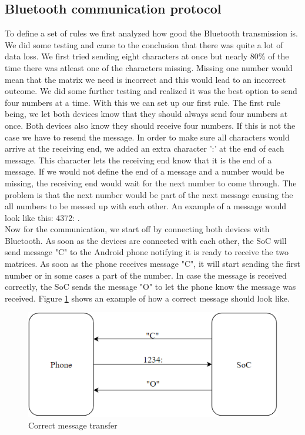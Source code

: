 \documentclass[a4paper, 11pt]{report}
\begin{document}
	\subsection{Bluetooth communication protocol}\label{subsec:bluetoothProtocol}
To define a set of rules we first analyzed how good the Bluetooth transmission is. We did some testing and came to the conclusion that there was quite a lot of data loss. We first tried sending eight characters at once but nearly 80\% of the time there was atleast one of the characters missing. Missing one number would mean that the matrix we need is incorrect and this would lead to an incorrect outcome. We did some further testing and realized it was the best option to send four numbers at a time. With this we can set up our first rule. The first rule being, we let both devices know that they should always send four numbers at once. Both devices also know they should receive four numbers. If this is not the case we have to resend the message.
In order to make sure all characters would arrive at the receiving end, we added an extra character ':' at the end of each message. This character lets the receiving end know that it is the end of a message. If we would not define the end of a message and a number would be missing, the receiving end would wait for the next number to come through. The problem is that the next number would be part of the next message causing the all numbers to be messed up with each other. An example of a message would look like this: 4372: .\\
Now for the communication, we start off by connecting both devices with Bluetooth. As soon as the devices are connected with each other, the SoC will send message "C" to the Android phone notifying it is ready to receive the two matrices. As soon as the phone receives message "C", it will start sending the first number or in some cases a part of the number. In case the message is received correctly, the SoC sends the message "O" to let the phone know the message was received. Figure \ref{fig:correctMessage} shows an example of how a correct message should look like.

\begin{figure}[ht]
\centering
\includegraphics[scale=0.7]{images/CorrectMsg.pdf}
\caption{Correct message transfer}\label{fig:correctMessage}
\end{figure}
\end{document}

